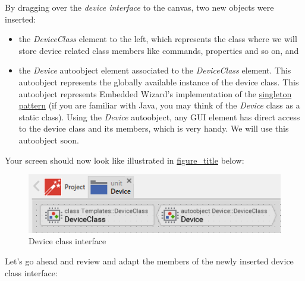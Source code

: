 \documentclass[
  a4paper,
,tablecaptionabove
]{scrbook}
\begin{document}
By dragging over the \emph{device interface} to the canvas, two new
objects were inserted:

\begin{itemize}
\item
  the \emph{DeviceClass} element to the left, which represents the class
  where we will store device related class members like commands,
  properties and so on, and
\item
  the \emph{Device} autoobject element associated to the
  \emph{DeviceClass} element. This autoobject represents the globally
  available instance of the device class. This autoobject represents
  Embedded Wizard's implementation of the
  \href{https://en.wikipedia.org/wiki/Singleton_pattern}{singleton
  pattern} (if you are familiar with Java, you may think of the
  \emph{Device} class as a static class). Using the \emph{Device}
  autoobject, any GUI element has direct access to the device class and
  its members, which is very handy. We will use this autoobject soon.
\end{itemize}

Your screen should now look like illustrated in
\protect\hyperlink{fig:DeviceClassInterface}{figure\_title} below:

\begin{figure}
\centering
\includegraphics{./../asciidoc/modules/ROOT/assets/images/deviceintegration/DeviceClassInterface.png}
\caption{Device class interface}
\end{figure}

Let's go ahead and review and adapt the members of the newly inserted
device class interface:
\end{document}
